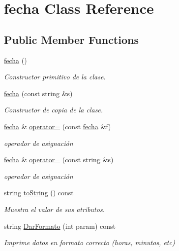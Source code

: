 \hypertarget{classfecha}{}\section{fecha Class Reference}
\label{classfecha}
\subsection*{Public Member Functions}
\begin{DoxyCompactItemize}
\item 
\hyperlink{classfecha_a6775ef84b5838e12e28fd341793f4539}{fecha} ()
\begin{DoxyCompactList}\small\item\em Constructor primitivo de la clase. \end{DoxyCompactList}\item 
\hyperlink{classfecha_aed5c22d5eeb15f1f2927d5a2c28b74df}{fecha} (const string \&s)
\begin{DoxyCompactList}\small\item\em Constructor de copia de la clase. \end{DoxyCompactList}\item 
\hyperlink{classfecha}{fecha} \& \hyperlink{classfecha_aeb5a68104e936f98eb933b4d6856f841}{operator=} (const \hyperlink{classfecha}{fecha} \&f)
\begin{DoxyCompactList}\small\item\em operador de asignación \end{DoxyCompactList}\item 
\hyperlink{classfecha}{fecha} \& \hyperlink{classfecha_afff8905488f3d97ecfe6141f8521ac22}{operator=} (const string \&s)
\begin{DoxyCompactList}\small\item\em operador de asignación \end{DoxyCompactList}\item 
string \hyperlink{classfecha_a26d22b980284408eac0da084f358c43b}{to\+String} () const 
\begin{DoxyCompactList}\small\item\em Muestra el valor de sus atributos. \end{DoxyCompactList}\item 
string \hyperlink{classfecha_af4bb41496cd45e4f8631fdd36c70299c}{Dar\+Formato} (int param) const 
\begin{DoxyCompactList}\small\item\em Imprime datos en formato correcto (horas, minutos, etc) \end{DoxyCompactList}\item 

\end{DoxyCompactItemize}
